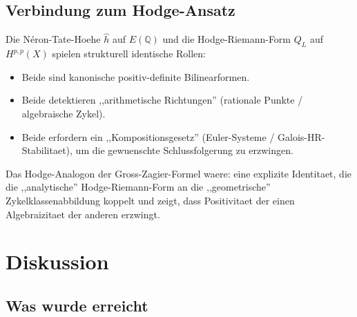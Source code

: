 \documentclass[aps,prd,twocolumn,superscriptaddress,nofootinbib]{revtex4-2}
\theoremstyle{definition}
\theoremstyle{remark}
\begin{document}
\subsection{Verbindung zum Hodge-Ansatz}

Die N\'eron-Tate-Hoehe $\hat{h}$ auf $E(\mathbb{Q})$ und die Hodge-Riemann-Form $Q_L$ auf $H^{p,p}(X)$ spielen strukturell identische Rollen:
\begin{itemize}
\item Beide sind kanonische positiv-definite Bilinearformen.
\item Beide detektieren ,,arithmetische Richtungen'' (rationale Punkte / algebraische Zykel).
\item Beide erfordern ein ,,Kompositionsgesetz'' (Euler-Systeme / Galois-HR-Stabilitaet), um die gewuenschte Schlussfolgerung zu erzwingen.
\end{itemize}

Das Hodge-Analogon der Gross-Zagier-Formel waere: eine explizite Identitaet, die die ,,analytische'' Hodge-Riemann-Form an die ,,geometrische'' Zykelklassenabbildung koppelt und zeigt, dass Positivitaet der einen Algebraizitaet der anderen erzwingt.


\section{Diskussion}
\label{sec:discussion}

\subsection{Was wurde erreicht}
\end{document}

